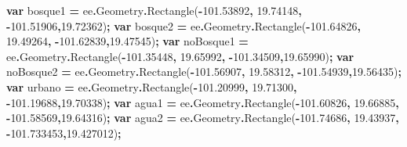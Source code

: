 \documentclass[
  12pt,
  letterpaper,
  twoside]{book}
\newenvironment{Shaded}{\begin{snugshade}}{\end{snugshade}}
\newcommand{\AttributeTok}[1]{\textcolor[rgb]{0.77,0.63,0.00}{#1}}
\newcommand{\FloatTok}[1]{\textcolor[rgb]{0.00,0.00,0.81}{#1}}
\newcommand{\FunctionTok}[1]{\textcolor[rgb]{0.00,0.00,0.00}{#1}}
\newcommand{\KeywordTok}[1]{\textcolor[rgb]{0.13,0.29,0.53}{\textbf{#1}}}
\newcommand{\NormalTok}[1]{#1}
\newcommand{\OperatorTok}[1]{\textcolor[rgb]{0.81,0.36,0.00}{\textbf{#1}}}
\begin{document}
\begin{Shaded}
\begin{Highlighting}[]
\KeywordTok{var}\NormalTok{ bosque1 }\OperatorTok{=}\NormalTok{ ee}\OperatorTok{.}\AttributeTok{Geometry}\OperatorTok{.}\FunctionTok{Rectangle}\NormalTok{(}\OperatorTok{{-}}\FloatTok{101.53892}\OperatorTok{,} \FloatTok{19.74148}\OperatorTok{,} 
  \OperatorTok{{-}}\FloatTok{101.51906}\OperatorTok{,}\FloatTok{19.72362}\NormalTok{)}\OperatorTok{;}
\KeywordTok{var}\NormalTok{ bosque2 }\OperatorTok{=}\NormalTok{ ee}\OperatorTok{.}\AttributeTok{Geometry}\OperatorTok{.}\FunctionTok{Rectangle}\NormalTok{(}\OperatorTok{{-}}\FloatTok{101.64826}\OperatorTok{,} \FloatTok{19.49264}\OperatorTok{,} 
  \OperatorTok{{-}}\FloatTok{101.62839}\OperatorTok{,}\FloatTok{19.47545}\NormalTok{)}\OperatorTok{;}
\KeywordTok{var}\NormalTok{ noBosque1 }\OperatorTok{=}\NormalTok{ ee}\OperatorTok{.}\AttributeTok{Geometry}\OperatorTok{.}\FunctionTok{Rectangle}\NormalTok{(}\OperatorTok{{-}}\FloatTok{101.35448}\OperatorTok{,} \FloatTok{19.65992}\OperatorTok{,} 
  \OperatorTok{{-}}\FloatTok{101.34509}\OperatorTok{,}\FloatTok{19.65990}\NormalTok{)}\OperatorTok{;}
\KeywordTok{var}\NormalTok{ noBosque2 }\OperatorTok{=}\NormalTok{ ee}\OperatorTok{.}\AttributeTok{Geometry}\OperatorTok{.}\FunctionTok{Rectangle}\NormalTok{(}\OperatorTok{{-}}\FloatTok{101.56907}\OperatorTok{,} \FloatTok{19.58312}\OperatorTok{,} 
  \OperatorTok{{-}}\FloatTok{101.54939}\OperatorTok{,}\FloatTok{19.56435}\NormalTok{)}\OperatorTok{;}
\KeywordTok{var}\NormalTok{ urbano }\OperatorTok{=}\NormalTok{ ee}\OperatorTok{.}\AttributeTok{Geometry}\OperatorTok{.}\FunctionTok{Rectangle}\NormalTok{(}\OperatorTok{{-}}\FloatTok{101.20999}\OperatorTok{,} \FloatTok{19.71300}\OperatorTok{,} 
  \OperatorTok{{-}}\FloatTok{101.19688}\OperatorTok{,}\FloatTok{19.70338}\NormalTok{)}\OperatorTok{;}
\KeywordTok{var}\NormalTok{ agua1 }\OperatorTok{=}\NormalTok{ ee}\OperatorTok{.}\AttributeTok{Geometry}\OperatorTok{.}\FunctionTok{Rectangle}\NormalTok{(}\OperatorTok{{-}}\FloatTok{101.60826}\OperatorTok{,} \FloatTok{19.66885}\OperatorTok{,} 
  \OperatorTok{{-}}\FloatTok{101.58569}\OperatorTok{,}\FloatTok{19.64316}\NormalTok{)}\OperatorTok{;}
\KeywordTok{var}\NormalTok{ agua2 }\OperatorTok{=}\NormalTok{ ee}\OperatorTok{.}\AttributeTok{Geometry}\OperatorTok{.}\FunctionTok{Rectangle}\NormalTok{(}\OperatorTok{{-}}\FloatTok{101.74686}\OperatorTok{,} \FloatTok{19.43937}\OperatorTok{,} 
  \OperatorTok{{-}}\FloatTok{101.733453}\OperatorTok{,}\FloatTok{19.427012}\NormalTok{)}\OperatorTok{;}


\end{Highlighting}
\end{Shaded}
\end{document}
